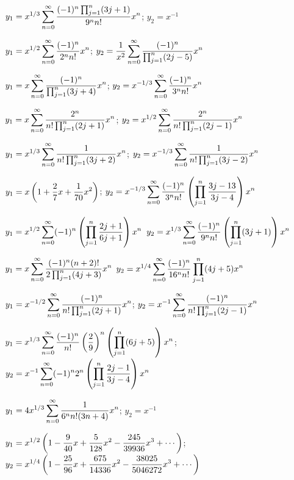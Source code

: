 $y_{1}=\displaystyle{x^{1/3}\sum_{n=0}^{\infty}\frac{(-1)^{n}\prod_{j=1}^{n}(3j+1)}{9^{n}n!}x^{n}}$;
$y_{2}=x^{-1}$

$y_{1}=\displaystyle{x^{1/2}\sum_{n=0}^{\infty}\frac{(-1)^{n}}{2^{n}n!}x^{n}}$;
$y_{2}=\displaystyle{\frac{1}{x^{2}}\sum_{n=0}^{\infty}\frac{(-1)^{n}}{\prod_{j=1}^{n}(2j-5)}
x^{n}}$

$y_{1}=\displaystyle{x\sum_{n=0}^{\infty}\frac{(-1)^{n}}{\prod_{j=1}^{n}(3j+4)}x^{n}}$;
  $y_{2}=\displaystyle{x^{-1/3}\sum_{n=0}^{\infty}\frac{(-1)^{n}}{3^{n}n!}x^{n}}$

$y_{1}=\displaystyle{x\sum_{n=0}^{\infty}\frac{2^{n}}{n!\prod_{j=1}^{n}(2j+1)}x^{n}}$;
$y_{2}=\displaystyle{x^{1/2}\sum_{n=0}^{\infty}\frac{2^{n}}{n!\prod_{j=1}^{n}(2j-1)}x^{n}}$

$y_{1}=\displaystyle{x^{1/3}\sum_{n=0}^{\infty}\frac{1}{n!\prod_{j=1}^{n}(3j+2)}x^{n}}$;
$y_{2}=\displaystyle{x^{-1/3}\sum_{n=0}^{\infty}\frac{1}{n!\prod_{j=1}^{n}(3j-2)}
x^{n}}$

$y_{1}=\displaystyle{x\left(1+\frac{2}{7}x+\frac{1}{70}x^{2}\right)}$;
$y_{2}=\displaystyle{x^{-1/3}\sum_{n=0}^{\infty}\frac{(-1)^{n}}{3^{n}n!}\left(\prod_{j=1}^{n}
\frac{3j-13}{3j-4}\right)
x^{n}}$

$y_{1}=\displaystyle{x^{1/2}\sum_{n=0}^{\infty}(-1)^{n}\left(\prod_{j=1}^{n}\frac{2j+1}{6j+1}\right)
x^{n}}$
$y_{2}=\displaystyle{x^{1/3}\sum_{n=0}^{\infty}\frac{(-1)^{n}}{9^{n}n!}
\left(\prod_{j=1}^{n}(3j+1)\right)x^{n}}$

$y_{1}=\displaystyle{x\sum_{n=0}^{\infty}\frac{(-1)^{n}(n+2)!}{2\prod_{j=1}^{n}(4j+3)}
x^{n}}$
$y_{2}=\displaystyle{x^{1/4}\sum_{n=0}^{\infty}\frac{(-1)^{n}}{16^{n}n!}\prod_{j=1}^{n}(4j+5)
x^{n}}$

$y_{1}=\displaystyle{x^{-1/2}\sum_{n=0}^{\infty}\frac{(-1)^{n}}{n!\prod_{j=1}^{n}(2j+1)}
x^{n}}$;    $y_{2}=\displaystyle{x^{-1}\sum_{n=0}^{\infty}\frac{(-1)^{n}}{n!\prod_{j=1}^{n}(2j-1)}x^{n}}$

$y_{1}=\displaystyle{x^{1/3}\sum_{n=0}^{\infty}\frac{(-1)^{n}}{n!}\left(\frac{2}{9}\right)^{n}\left(\prod_{j=1}^{n}(6j+5)\right)
x^{n}}$;
$y_{2}=\displaystyle{x^{-1}\sum_{n=0}^{\infty}(-1)^{n}2^{n}\left(\prod_{j=1}^{n}
\frac{2j-1}{3j-4}\right)x^{n}}$

$y_{1}=4\displaystyle{x^{1/3}\sum_{n=0}^{\infty}\frac{1}{6^{n}n!(3n+4)}
x^{n}}$;
 $y_{2}=x^{-1}$

$y_{1}=\displaystyle{x^{1/2}\left(1-\frac{9}{40}x+\frac{5}{128}x^{2}-\frac{245}{39936}x^{3}
+\cdots\right)}$;    \,
$y_{2}=\displaystyle{x^{1/4}\left(1-\frac{25}{96}x+\frac{675}{14336}x^{2}-
\frac{38025}{5046272}x^{3}
+\cdots\right)}$

